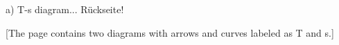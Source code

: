 a) T-s diagram... Rückseite!

[The page contains two diagrams with arrows and curves labeled as T and s.]